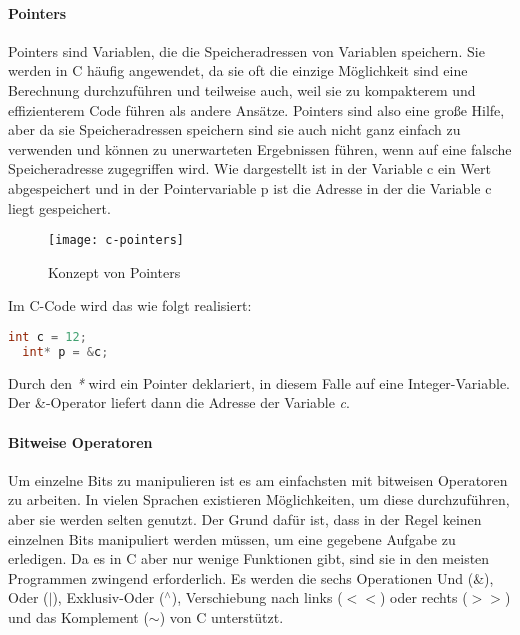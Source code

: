  \paragraph{Pointers}
  Pointers sind Variablen, die die Speicheradressen von Variablen speichern. Sie werden in C häufig
  angewendet, da sie oft die einzige Möglichkeit sind eine Berechnung durchzuführen und teilweise
  auch, weil sie zu kompakterem und effizienterem Code führen als andere Ansätze. \cite{kernighan88}
  Pointers sind also eine große Hilfe, aber da sie Speicheradressen speichern sind sie auch nicht ganz
  einfach zu verwenden und können zu unerwarteten Ergebnissen führen, wenn auf eine falsche
  Speicheradresse zugegriffen wird. Wie  dargestellt ist in der Variable c ein
  Wert abgespeichert  und in der Pointervariable p ist die Adresse in der die Variable c liegt gespeichert.
  
  \begin{figure}[h!]
   \begin{center}
    \texttt{[image: c-pointers]}
   \end{center}
   \caption[Konzept von Pointers in C]{Konzept von Pointers \cite{kernighan88}}
   \label{fig:c-pointers}
  \end{figure}
  
  Im C-Code wird das wie folgt realisiert:

  \begin{lstlisting}[language=C]
  int c = 12;
  int* p = &c;
  \end{lstlisting}
  Durch den \emph{*} wird ein Pointer deklariert, in diesem Falle auf eine Integer-Variable. Der \&-Operator
  liefert dann die Adresse der Variable \emph{c}.

  \paragraph{Bitweise Operatoren}
  Um einzelne Bits zu manipulieren ist es am einfachsten mit bitweisen Operatoren zu arbeiten. In vielen
  Sprachen existieren Möglichkeiten, um diese durchzuführen, aber sie werden selten genutzt. Der Grund
  dafür ist, dass in der Regel keinen einzelnen Bits manipuliert werden müssen, um eine gegebene Aufgabe
  zu erledigen. Da es in C aber nur wenige Funktionen gibt, sind sie in den meisten Programmen zwingend
  erforderlich. Es werden die sechs Operationen Und (\&), Oder ($|$), Exklusiv-Oder ($^{\wedge}$), Verschiebung nach
  links ($<<$) oder rechts ($>>$) und das Komplement ($\sim$) von C unterstützt.

